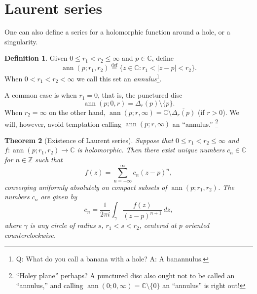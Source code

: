 \documentclass[12pt,openany]{book}
\newcommand{\ann}{\operatorname{ann}}
\newcommand{\sabs}[1]{\lvert {#1} \rvert}
\newcommand{\C}{{\mathbb{C}}}
\newcommand{\Z}{{\mathbb{Z}}}
\newcommand{\myindex}[1]{#1\index{#1}}
\newcommand{\myquote}[1]{``#1''}
\theoremstyle{plain}
\newtheorem{thm}{Theorem}[section]
\theoremstyle{remark}
\theoremstyle{definition}
\newtheorem{defn}[thm]{Definition}
\theoremstyle{exercise}
\theoremstyle{example}
\begin{document}

\section{Laurent series}

One can also define a series for a holomorphic function around a hole, or a singularity.

\begin{defn}
Given $0 \leq r_1 < r_2 \leq \infty$ and $p \in \C$, define
%
\begin{equation*}
\ann(p;r_1,r_2)
\overset{\text{def}}{=}
\{ z \in \C : r_1 < \sabs{z - p} < r_2 \} .
\end{equation*}
When $0 < r_1 < r_2 < \infty$ we call this set an
\emph{\myindex{annulus}}\footnote{%
Q\@: What do you call a banana with a hole?
A\@: A banannulus.}.
\end{defn}

A common case is when $r_1 = 0$, that is,
the punctured disc
\begin{equation*}
\ann(p;0,r) = \Delta_r(p) \setminus \{ p \} .
\end{equation*}
When $r_2 = \infty$ on the other hand,
$\ann(p;r,\infty) = \C \setminus \overline{\Delta_{r}(p)}$ (if $r > 0$).  We will,
however, avoid temptation calling $\ann(p;r,\infty)$ an \myquote{annulus.}%
\footnote{\myquote{Holey plane} perhaps?  A punctured disc also ought not to be
called an \myquote{annulus,} and calling $\ann(0;0,\infty) = \C \setminus
\{ 0 \}$ an \myquote{annulus} is right out!}

\begin{thm}[Existence of Laurent series]
%
%
\label{thm:laurent}%
Suppose that $0 \leq r_1 < r_2 \leq \infty$ and
$f \colon \ann(p;r_1,r_2) \to \C$ is holomorphic.
Then there exist unique numbers $c_n \in \C$ for $n \in \Z$ such that
%
\begin{equation*}
f(z) = \sum_{n=-\infty}^{\infty} c_n {(z-p)}^n ,
\end{equation*}
converging uniformly absolutely on compact subsets of
$\ann(p;r_1,r_2)$.  The numbers $c_n$ are given by
\begin{equation*}
c_n = 
\frac{1}{2\pi i}
\int_{\gamma}
\frac{f(z)}{{(z-p)}^{n+1}}
\,
dz  ,
\end{equation*}
where $\gamma$ is any circle of radius $s$, $r_1 < s < r_2$, centered at
$p$ oriented counterclockwise.
\end{thm}
\end{document}
